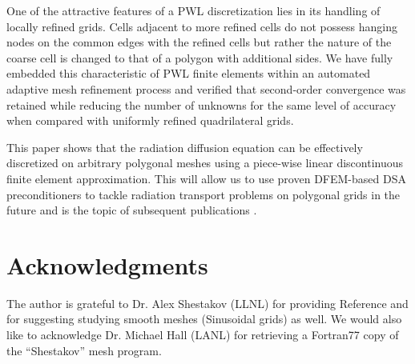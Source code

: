 \documentclass[preprint,10pt]{elsarticle}
\newcommand{\tcr}[1]{\textcolor{red}{#1}}
\begin{document}
One of the attractive features of a PWL discretization lies in its handling of locally refined grids.
Cells adjacent to more refined cells do not possess hanging nodes on the common edges with the refined cells
but rather the nature of the coarse cell is changed to that of a polygon with additional sides. We have
fully embedded this characteristic of PWL finite elements within an automated adaptive mesh refinement process
and verified that second-order convergence was retained while reducing the number of unknowns for the same 
level of accuracy when compared with uniformly refined quadrilateral grids.


This paper shows that the radiation diffusion equation can be effectively discretized on arbitrary 
polygonal meshes using a piece-wise linear discontinuous finite element approximation. 
This will allow us to use proven DFEM-based DSA preconditioners \cite{Ragusa_Wang_NSE_2010} to tackle 
radiation transport problems on polygonal grids in the future and is the topic of subsequent 
publications \cite{TurcksinRagusa2014}.
%
 

\section*{Acknowledgments} 

The author is grateful to Dr. Alex Shestakov (LLNL) for providing Reference \cite{Sheshakov1990}
and for suggesting studying smooth meshes (Sinusoidal grids) as well. We would also like to
acknowledge Dr. Michael Hall (LANL) for retrieving a Fortran77 copy of the ``Shestakov'' mesh program. 
\end{document}
